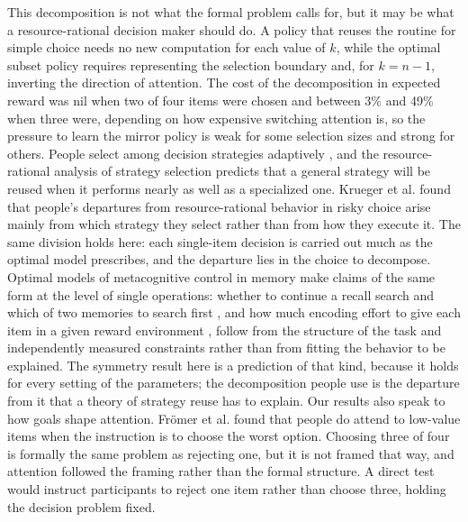 \documentclass[10pt,letterpaper]{article}
\begin{document}
This decomposition is not what the formal problem calls for, but it may
be what a resource-rational decision maker should do. A policy that
reuses the routine for simple choice needs no new computation for each
value of \(k\), while the optimal subset policy requires representing
the selection boundary and, for \(k = n - 1\), inverting the direction
of attention. The cost of the decomposition in expected reward was nil
when two of four items were chosen and between 3\% and 49\% when three
were, depending on how expensive switching attention is, so the pressure
to learn the mirror policy is weak for some selection sizes and strong
for others. People select among decision strategies adaptively
\cite{payne1988}, and the resource-rational analysis of strategy
selection \cite{lieder2017,lieder2020,lieder2026,shenhav2017,kool2018}
predicts that a general strategy will be reused when it performs nearly
as well as a specialized one. Krueger et al. \cite{krueger2024} found
that people's departures from resource-rational behavior in risky choice
arise mainly from which strategy they select rather than from how they
execute it. The same division holds here: each single-item decision is
carried out much as the optimal model prescribes, and the departure lies
in the choice to decompose. Optimal models of metacognitive control in
memory make claims of the same form at the level of single operations:
whether to continue a recall search and which of two memories to search
first \cite{callaway2024}, and how much encoding effort to give each
item in a given reward environment \cite{ma2026}, follow from the
structure of the task and independently measured constraints rather than
from fitting the behavior to be explained. The symmetry result here is a
prediction of that kind, because it holds for every setting of the
parameters; the decomposition people use is the departure from it that a
theory of strategy reuse has to explain. Our results also speak to how
goals shape attention. Frömer et al. \cite{fromer2026} found that people
do attend to low-value items when the instruction is to choose the worst
option. Choosing three of four is formally the same problem as rejecting
one, but it is not framed that way, and attention followed the framing
rather than the formal structure. A direct test would instruct
participants to reject one item rather than choose three, holding the
decision problem fixed.
\end{document}
